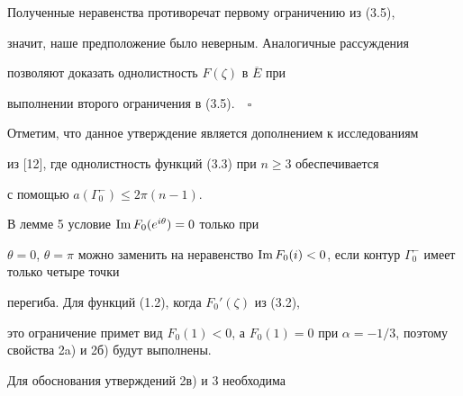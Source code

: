 Полученные неравенства противоречат первому ограничению из (3.5), 


значит, наше предположение было неверным. Аналогичные рассуждения


позволяют доказать однолистность $F(\zeta)$ в $\overline E$ при


выполнении второго ограничения в (3.5).$\quad\square$


\medskip





Отметим, что данное утверждение является дополнением к исследованиям


из [12], где однолистность функций (3.3) при $n\ge 3$ обеспечивается


с помощью $a({\Gamma }_0^{-})\le 2\pi(n-1)$.





В лемме 5 условие $\operatorname{Im} F_0(e^{i\theta})=0$ только при


$\theta=0$, $\theta=\pi$ можно заменить на неравенство $\im F_0


(i)<0$, если контур ${\Gamma }_0^{-}$ имеет только четыре точки


перегиба. Для функций (1.2), когда $F_0'(\zeta)$ из (3.2),


это ограничение примет вид $F_0(1)<0$, а $F_0(1)=0$ при $\alpha=


{-1}/3$, поэтому свойства 2a) и 2б) будут выполнены.





Для обоснования утверждений 2в) и 3 необходима





